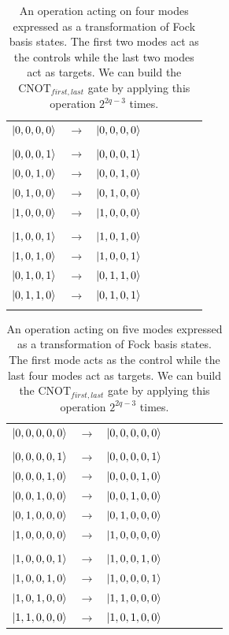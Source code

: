 \documentclass[aps,pra,twocolumn,showpacs,superscriptaddress,floatfix,10pt]{revtex4}
\begin{document}
\begin {table}[h]
\begin{center}
	\begin{tabular}{l*{6}{c}r} 
		$\ket{0,0,0,0}$  &  $\rightarrow$ & $\ket{0,0,0,0}$ \\ \\
		$\ket{0,0,0,1}$  & $\rightarrow$ & $\ket{0,0,0,1}$ \\
		$\ket{0,0,1,0}$ & $\rightarrow$ & $\ket{0,0,1,0}$ \\
		$\ket{0,1,0,0}$ & $\rightarrow$ & $\ket{0,1,0,0} $ \\ 
		$\ket{1,0,0,0}$ & $\rightarrow$ & $\ket{1,0,0,0} $ \\ \\
		$\ket{1,0,0,1}$  & $\rightarrow$ & $\ket{1,0,1,0}$ \\
		$\ket{1,0,1,0}$ & $\rightarrow$ & $\ket{1,0,0,1}$ \\
		$\ket{0,1,0,1}$ & $\rightarrow$ & $\ket{0,1,1,0} $ \\ 
		$\ket{0,1,1,0}$ & $\rightarrow$ & $\ket{0,1,0,1} $ \\ \\
	\end{tabular}
	\caption{ \label{Two Controls Two Targets} An operation acting on four modes expressed as a transformation of Fock basis states. The first two modes act as the controls while the last two modes act as targets. We can build the $\mbox{CNOT}_{first,last}$ gate by applying this operation $2^{2 q - 3}$ times.}
\end{center}
\end{table}
\begin {table}[h]
\begin{center}
	\begin{tabular}{l*{6}{c}r} 
		$\ket{0,0,0,0,0}$  &  $\rightarrow$ & $\ket{0,0,0,0,0}$ \\ \\
		$\ket{0,0,0,0,1}$  & $\rightarrow$ & $\ket{0,0,0,0,1}$ \\
		$\ket{0,0,0,1,0}$ & $\rightarrow$ & $\ket{0,0,0,1,0}$ \\
		$\ket{0,0,1,0,0}$ & $\rightarrow$ & $\ket{0,0,1,0,0} $ \\ 
		$\ket{0,1,0,0,0}$ & $\rightarrow$ & $\ket{0,1,0,0,0} $\\
		$\ket{1,0,0,0,0}$ & $\rightarrow$ & $\ket{1,0,0,0,0} $ \\ \\
		$\ket{1,0,0,0,1}$  & $\rightarrow$ & $\ket{1,0,0,1,0}$ \\
		$\ket{1,0,0,1,0}$  & $\rightarrow$ & $\ket{1,0,0,0,1}$ \\
		$\ket{1,0,1,0,0}$  & $\rightarrow$ & $\ket{1,1,0,0,0}$ \\
		$\ket{1,1,0,0,0}$  & $\rightarrow$ & $\ket{1,0,1,0,0}$ \\
	\end{tabular}
	\caption{ \label{One Control Four Targets} An operation acting on five modes expressed as a transformation of Fock basis states. The first mode acts as the control while the last four modes act as targets. We can build the $\mbox{CNOT}_{first,last}$ gate by applying this operation $2^{2 q - 3}$ times.}
\end{center}
\end{table}
\end{document}
